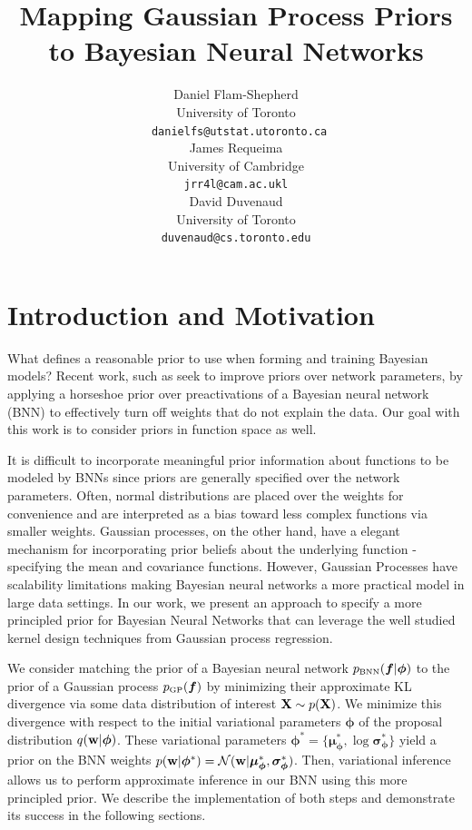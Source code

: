 \documentclass{article}
\title{Mapping Gaussian Process Priors
\\ to Bayesian Neural Networks}
\author{
  Daniel Flam-Shepherd \\
  University of Toronto \\
  \texttt{ danielfs@utstat.utoronto.ca} \\
  \And
  James Requeima  \\
  University of Cambridge \\
  \texttt{jrr4l@cam.ac.ukl} \\
  \And
  David Duvenaud \\
  University of Toronto \\
  \texttt{duvenaud@cs.toronto.edu} \\
}
\begin{document}
\maketitle


\section{Introduction and Motivation}
What defines a reasonable prior to use when forming and training Bayesian models? 
 Recent work, such as \cite{hsp} seek to improve priors over network parameters, by applying
 a horseshoe prior over preactivations of a Bayesian neural network (BNN) to 
effectively turn off weights that do not explain the data. Our goal with this work
is to consider priors in function space as well. 

It is difficult to incorporate meaningful prior information about functions to be 
modeled by BNNs since priors are generally specified over the network parameters. 
Often, normal distributions are placed over the weights for convenience and 
are interpreted as a bias toward less complex functions via smaller weights. 
Gaussian processes, on the other hand, have a elegant mechanism for incorporating 
prior beliefs about the underlying function - specifying the mean and covariance functions.
However, Gaussian Processes have scalability limitations making Bayesian neural networks 
a more practical model in large data settings. 
In our work, we present an approach to specify a more principled prior for 
Bayesian Neural Networks that can leverage the well studied kernel design techniques from Gaussian process regression.


We consider matching the prior of a Bayesian neural network $\pbnn (\bm f |\bm \phi )$
to the prior of a Gaussian process $\pgp (\bm f  ) $ 
 by minimizing their approximate KL divergence via 
some data distribution of interest $ \mathbf{X}  \sim p( \mathbf{X} )$. 
We minimize this divergence with respect to the initial variational parameters $\bm \phi$ 
of the proposal distribution $q( \mathbf{w}  |\bm \phi)$. 
These variational parameters 
$\bm \phi^* = \{ \bm \mu _{\bm \phi}^* , \log \bm \sigma _{\bm \phi} ^* \} $ 
yield a prior on the BNN weights 
$p( \mathbf{w} |\bm \phi^* ) = \mathcal{N} ( \mathbf{w}  |\bm \mu _{\bm \phi}^* , \bm \sigma _{\bm \phi} ^* )$. 
Then, variational inference allows us to perform approximate inference in our BNN using this more 
principled prior. We describe the implementation of both steps and demonstrate its success in the following sections. 
\end{document}
